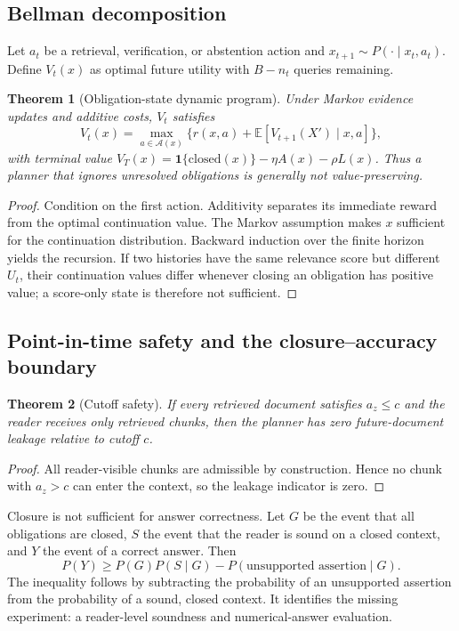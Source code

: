 \documentclass[12pt]{article}
\newtheorem{theorem}{Theorem}
\begin{document}
\subsection{Bellman decomposition}
Let $a_t$ be a retrieval, verification, or abstention action and $x_{t+1}\sim P(\cdot\mid x_t,a_t)$. Define $V_t(x)$ as optimal future utility with $B-n_t$ queries remaining.
\begin{theorem}[Obligation-state dynamic program]
Under Markov evidence updates and additive costs, $V_t$ satisfies
\[
 V_t(x)=\max_{a\in\mathcal{A}(x)}\{r(x,a)+\mathbb{E}[V_{t+1}(X')\mid x,a]\},
\]
with terminal value $V_T(x)=\mathbf{1}\{\mathrm{closed}(x)\}-\eta A(x)-\rho L(x)$. Thus a planner that ignores unresolved obligations is generally not value-preserving.
\end{theorem}
\begin{proof}
Condition on the first action. Additivity separates its immediate reward from the optimal continuation value. The Markov assumption makes $x$ sufficient for the continuation distribution. Backward induction over the finite horizon yields the recursion. If two histories have the same relevance score but different $U_t$, their continuation values differ whenever closing an obligation has positive value; a score-only state is therefore not sufficient.
\end{proof}

\subsection{Point-in-time safety and the closure--accuracy boundary}
\begin{theorem}[Cutoff safety]
If every retrieved document satisfies $a_z\le c$ and the reader receives only retrieved chunks, then the planner has zero future-document leakage relative to cutoff $c$.
\end{theorem}
\begin{proof}
All reader-visible chunks are admissible by construction. Hence no chunk with $a_z>c$ can enter the context, so the leakage indicator is zero.
\end{proof}
Closure is not sufficient for answer correctness. Let $G$ be the event that all obligations are closed, $S$ the event that the reader is sound on a closed context, and $Y$ the event of a correct answer. Then
\[
 P(Y)\ge P(G)P(S\mid G)-P(\text{unsupported assertion}\mid G).
\]
The inequality follows by subtracting the probability of an unsupported assertion from the probability of a sound, closed context. It identifies the missing experiment: a reader-level soundness and numerical-answer evaluation.
\end{document}
